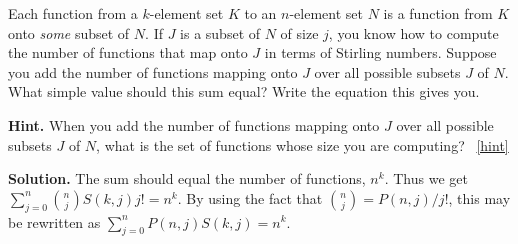 \documentclass{book}
\begin{document}
\setcounter{project}{204}
\addtocounter{project}{-1}
\begin{activity}[]\label{Stirlingfalling}
\hypertarget{p-1117}{}%
Each function from a \(k\)-element set \(K\) to an \(n\)-element set \(N\) is a function from \(K\) onto \emph{some} subset of \(N\). If \(J\) is a subset of \(N\) of size \(j\), you know how to compute the number of functions that map onto \(J\) in terms of Stirling numbers. Suppose you add the number of functions mapping onto \(J\) over all possible subsets \(J\) of \(N\). What simple value should this sum equal? Write the equation this gives you.%
\par\smallskip%
\noindent\textbf{Hint.}\hypertarget{hint-129}{}\quad%
\hypertarget{p-1118}{}%
When you add the number of functions mapping onto \(J\) over all possible subsets \(J\) of \(N\), what is the set of functions whose size you are computing?%
~\hfill{\tiny\hyperlink{a-204}{[hint]}\hypertarget{q-204}{}}\par\smallskip%
\noindent\textbf{Solution.}\hypertarget{solution-93}{}\quad%
\hypertarget{p-1119}{}%
The sum should equal the number of functions, \(n^k\). Thus we get \(\sum_{j=0}^n \binom{n}{j}S(k,j)j! = n^k\). By using the fact that \(\binom{n}{j}= P(n,j)/j!\), this may be rewritten as \(\sum_{j=0}^n P(n,j)S(k,j) = n^k.\)%
\end{activity}

\clearpage
\end{document}
